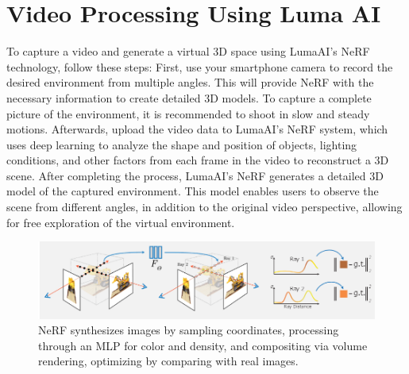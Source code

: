 \section{Video Processing Using Luma AI}
\label{sec:Video Processing Using Luma AI}
\singlespacing
To capture a video and generate a virtual 3D space using LumaAI's NeRF technology, follow these steps:
\singlespacing
First, use your smartphone camera to record the desired environment from multiple angles.  This will provide NeRF with the necessary information to create detailed 3D models. To capture a complete picture of the environment, it is recommended to shoot in slow and steady motions.
\singlespacing
Afterwards, upload the video data to LumaAI's NeRF system, which uses deep learning to analyze the shape and position of objects, lighting conditions, and other factors from each frame in the video to reconstruct a 3D scene.
\singlespacing
After completing the process, LumaAI's NeRF generates a detailed 3D model of the captured environment. This model enables users to observe the scene from different angles, in addition to the original video perspective, allowing for free exploration of the virtual environment.


\begin{figure}[htbp]
  \centering
  \includegraphics[scale=0.55]{./Figure/画像19.png}
  
  \caption{NeRF synthesizes images by sampling coordinates, processing through an MLP for color and density, and compositing via volume rendering, optimizing by comparing with real images.}
  \label{fig:NeRF synthesizes images}
\end{figure}


